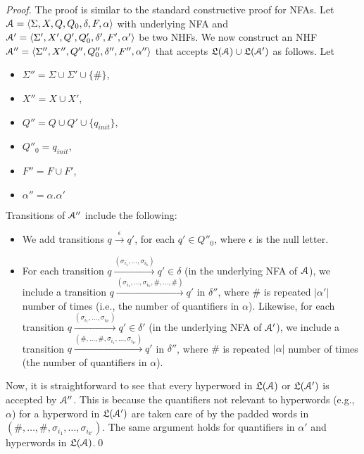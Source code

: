 \begin{proof}
The proof is similar to the standard constructive proof for NFAs. Let $\mathcal{A} = 
\langle \Sigma,X,Q,Q_0,\delta,F,\alpha \rangle$ with underlying NFA and $\mathcal{A}'= 
\langle \Sigma',X',Q',Q'_0,\delta',F',\alpha' \rangle$ be two NHFs. We now construct an 
NHF $\mathcal{A}'' = \langle \Sigma'',X'',Q'',Q''_0,\delta'',F'',\alpha'' \rangle$ that accepts 
$\mathfrak{L}(\mathcal{A}) \cup \mathfrak{L}(\mathcal{A}')$ as follows. Let
%
\begin{itemize}
 \item  $\Sigma'' = \Sigma \cup \Sigma' \cup \{\#\}$,
 \item $X'' = X \cup X'$,
 \item $Q'' = Q \cup Q' \cup \{q_{\mathit{init}}\}$, 
 \item $Q''_0 = q_{\mathit{init}}$,
 \item $F'' = F \cup F'$,
 \item $\alpha'' = \alpha.\alpha'$
 
\end{itemize}
%
Transitions of $\mathcal{A}''$ include the following:

\begin{itemize}
 \item  We add transitions $q\xrightarrow{\epsilon} q'$, for each $q' \in 
Q''_0$, where $\epsilon$ is the null letter. 

\item For each transition $q \xrightarrow{(\sigma_{i_1}, \dots, \sigma_{i_k})} 
q' \in \delta$ (in the underlying NFA of $\mathcal{A}$), we include a transition $q 
\xrightarrow{(\sigma_{i_1}, \dots, \sigma_{i_k}, \#, \dots, \#)} q'$ in 
$\delta''$, where $\#$ is repeated $|\alpha'|$ number of times (i.e., the number 
of quantifiers in $\alpha$). Likewise, for each transition $q 
\xrightarrow{(\sigma_{i_1}, \dots, \sigma_{i_{k'}})} q' \in \delta'$ (in the 
underlying NFA of $\mathcal{A}'$), we include a transition $q \xrightarrow{(\#, \dots, 
\#, \sigma_{i_1}, \dots, \sigma_{i_{k'}})} q'$ in $\delta''$, where $\#$ is 
repeated $|\alpha|$ number of times (the number of quantifiers in $\alpha$).
\end{itemize}

Now, it is straightforward to see that every hyperword in $\mathfrak{L}(\mathcal{A})$ or 
$\mathfrak{L}(\mathcal{A}')$ is accepted by $\mathcal{A}''$. This is because the quantifiers not 
relevant to hyperwords (e.g., $\alpha$) for a hyperword in $\mathfrak{L}(\mathcal{A}')$ are 
taken care of by the padded words in $(\#, \dots, \#, \sigma_{i_1}, \dots, 
\sigma_{i_{k'}})$. The same argument holds for quantifiers in $\alpha'$ and 
hyperwords in $\mathfrak{L}(\mathcal{A})$.\qed

\end{proof}


